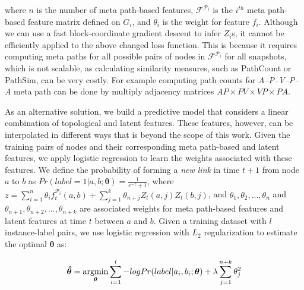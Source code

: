 where $n$ is the number of meta path-based features, $\mathcal{F}^{\mathcal{P}_i}$ is the $i^{th}$ meta path-based feature matrix defined on $G_i$, and $\theta_i$ is the weight for feature $f_i$. Although we can use a fast block-coordinate gradient descent \cite{Zhu2016} to infer $Z_i$s, it cannot be efficiently applied to the above changed loss function. This is because it requires computing meta paths for all possible pairs of nodes in $\mathcal{F}^{\mathcal{P}_i}$ for all snapshots, which is not scalable, as calculating similarity measures, such as PathCount or PathSim, can be very costly. For example computing path counts for \textit{A--P--V--P--A} meta path can be done by multiply adjacency matrices $AP\times PV\times VP\times PA$. 


As an alternative solution, we build a predictive model that considers a linear combination of topological and latent features. These features, however, can be interpolated in different ways that is beyond the scope of this work. Given the training pairs of nodes and their corresponding meta path-based and latent features, we apply logistic regression to learn the weights associated with these features. We define the probability of forming a \textit{new link} in time $t+1$ from node $a$ to $b$ as %
 $Pr(label=1|a, b; \boldsymbol{\theta}) = \frac{1}{e^{-z}+1}$, where $z=\sum\limits_{i=1}^{n}\theta_i f_t^{\mathcal{P}_i}(a,b) + \sum\limits_{j=1}^{k} \theta_{n+j}Z_t(a,j)Z_t(b,j)$, and $\theta_1,\theta_2,..., \theta_n$ and $\theta_{n+1},\theta_{n+2},..., \theta_{n+k}$ are associated weights for meta path-based features and latent features at time $t$ between $a$ and $b$. Given a training dataset with $l$ instance-label pairs, we use logistic regression with $L_2$ regularization to estimate the optimal $\boldsymbol{\theta}$ as:%


\begin{equation}
\boldsymbol{\hat{\theta}} = 
\operatorname*{argmin}\limits_{\boldsymbol{\theta}}\sum_{i=1}^l -log Pr(label |a_i, b_i; \boldsymbol{\theta}) + \lambda \sum_{j=1}^{n+k} \theta_j^2
\end{equation}
 
